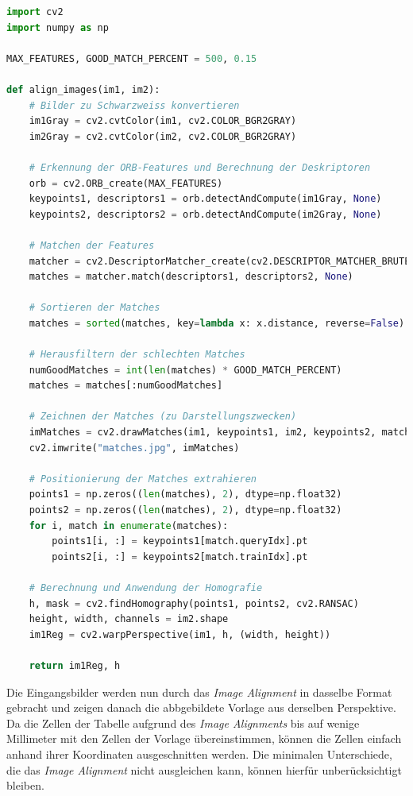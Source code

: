 \begin{minipage}{\textwidth}
	\begin{lstlisting}[language=Python, caption=Code für \textit{Image Alignment}, label=lst:align_images]
import cv2
import numpy as np

MAX_FEATURES, GOOD_MATCH_PERCENT = 500, 0.15

def align_images(im1, im2):
	# Bilder zu Schwarzweiss konvertieren
	im1Gray = cv2.cvtColor(im1, cv2.COLOR_BGR2GRAY)
	im2Gray = cv2.cvtColor(im2, cv2.COLOR_BGR2GRAY)

	# Erkennung der ORB-Features und Berechnung der Deskriptoren
	orb = cv2.ORB_create(MAX_FEATURES)
	keypoints1, descriptors1 = orb.detectAndCompute(im1Gray, None)
	keypoints2, descriptors2 = orb.detectAndCompute(im2Gray, None)

	# Matchen der Features
	matcher = cv2.DescriptorMatcher_create(cv2.DESCRIPTOR_MATCHER_BRUTEFORCE_HAMMING)
	matches = matcher.match(descriptors1, descriptors2, None)

	# Sortieren der Matches
	matches = sorted(matches, key=lambda x: x.distance, reverse=False)

	# Herausfiltern der schlechten Matches
	numGoodMatches = int(len(matches) * GOOD_MATCH_PERCENT)
	matches = matches[:numGoodMatches]

	# Zeichnen der Matches (zu Darstellungszwecken)
	imMatches = cv2.drawMatches(im1, keypoints1, im2, keypoints2, matches, None)
	cv2.imwrite("matches.jpg", imMatches)

	# Positionierung der Matches extrahieren
	points1 = np.zeros((len(matches), 2), dtype=np.float32)
	points2 = np.zeros((len(matches), 2), dtype=np.float32)
	for i, match in enumerate(matches):
		points1[i, :] = keypoints1[match.queryIdx].pt
		points2[i, :] = keypoints2[match.trainIdx].pt

	# Berechnung und Anwendung der Homografie
	h, mask = cv2.findHomography(points1, points2, cv2.RANSAC)
	height, width, channels = im2.shape
	im1Reg = cv2.warpPerspective(im1, h, (width, height))

	return im1Reg, h
	\end{lstlisting}
\end{minipage}

Die Eingangsbilder werden nun durch das \textit{Image Alignment} in dasselbe Format gebracht und zeigen danach die abbgebildete Vorlage aus derselben Perspektive.
Da die Zellen der Tabelle aufgrund des \textit{Image Alignments} bis auf wenige Millimeter mit den Zellen der Vorlage übereinstimmen, können die Zellen einfach
anhand ihrer Koordinaten ausgeschnitten werden. Die minimalen Unterschiede, die das \textit{Image Alignment} nicht ausgleichen kann, können hierfür unberücksichtigt
bleiben.

